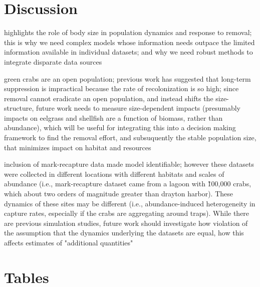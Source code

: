 \documentclass{article}
\begin{document}
\section{Discussion}

highlights the role of body size in population dynamics and response to removal; this is why we need complex models whose information needs outpace the limited information available in individual datasets; and why we need robust methods to integrate disparate data sources

green crabs are an open population; previous work has suggested that long-term suppression is impractical because the rate of recolonization is so high; since removal cannot eradicate an open population, and instead shifts the size-structure, future work needs to measure size-dependent impacts (presumably impacts on eelgrass and shellfish are a function of biomass, rather than abundance), which will be useful for integrating this into a decision making framework to find the removal effort, and subsuquently the stable population size, that minimizes impact on habitat and resources

inclusion of mark-recapture data made model identifiable; however these datasets were collected in different locations with different habitats and scales of abundance (i.e., mark-recapture dataset came from a lagoon with \~100,000 crabs, which about two orders of magnitude greater than drayton harbor). These dynamics of these sites may be different 
(i.e., abundance-induced heterogeneity in capture rates, especially if the crabs are aggregating around traps). While there are previous simulation studies, future work should investigate how violation of the assumption that the dynamics underlying the datasets are equal, how this affects estimates of "additional quantities"

\newpage

\section{Tables}

\renewcommand{\arraystretch}{1.25}
\end{document}
